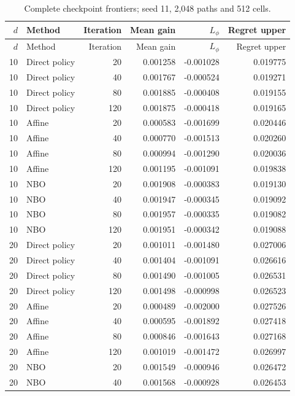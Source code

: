 {\small\setlength{\tabcolsep}{4pt}
\begin{longtable}{rlrrrr}
\caption{Complete checkpoint frontiers; seed 11, 2,048 paths and 512 cells.}\label{tab:r11allfront}\\
\toprule
$d$ & Method & Iteration & Mean gain & $L_\phi$ & Regret upper\\\midrule\endfirsthead
$d$ & Method & Iteration & Mean gain & $L_\phi$ & Regret upper\\\midrule\endhead
10 & Direct policy & 20 & 0.001258 & -0.001028 & 0.019775 \\
10 & Direct policy & 40 & 0.001767 & -0.000524 & 0.019271 \\
10 & Direct policy & 80 & 0.001885 & -0.000408 & 0.019155 \\
10 & Direct policy & 120 & 0.001875 & -0.000418 & 0.019165 \\
10 & Affine & 20 & 0.000583 & -0.001699 & 0.020446 \\
10 & Affine & 40 & 0.000770 & -0.001513 & 0.020260 \\
10 & Affine & 80 & 0.000994 & -0.001290 & 0.020036 \\
10 & Affine & 120 & 0.001195 & -0.001091 & 0.019838 \\
10 & NBO & 20 & 0.001908 & -0.000383 & 0.019130 \\
10 & NBO & 40 & 0.001947 & -0.000345 & 0.019092 \\
10 & NBO & 80 & 0.001957 & -0.000335 & 0.019082 \\
10 & NBO & 120 & 0.001951 & -0.000342 & 0.019088 \\
20 & Direct policy & 20 & 0.001011 & -0.001480 & 0.027006 \\
20 & Direct policy & 40 & 0.001404 & -0.001091 & 0.026616 \\
20 & Direct policy & 80 & 0.001490 & -0.001005 & 0.026531 \\
20 & Direct policy & 120 & 0.001498 & -0.000998 & 0.026523 \\
20 & Affine & 20 & 0.000489 & -0.002000 & 0.027526 \\
20 & Affine & 40 & 0.000595 & -0.001892 & 0.027418 \\
20 & Affine & 80 & 0.000846 & -0.001643 & 0.027168 \\
20 & Affine & 120 & 0.001019 & -0.001472 & 0.026997 \\
20 & NBO & 20 & 0.001549 & -0.000946 & 0.026472 \\
20 & NBO & 40 & 0.001568 & -0.000928 & 0.026453 \\

\end{longtable}}
